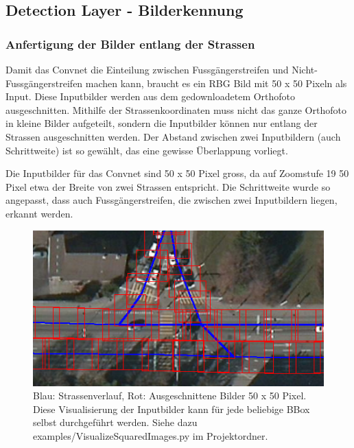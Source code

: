 
\subsection{Detection Layer - Bilderkennung}

\subsubsection{Anfertigung der Bilder entlang der Strassen}
Damit das Convnet die Einteilung zwischen Fussgängerstreifen und Nicht-Fussgängerstreifen machen kann, braucht es ein RBG Bild mit 50 x 50 Pixeln als Input. Diese \Gls{Inputbild}er werden aus dem gedownloadetem Orthofoto ausgeschnitten. Mithilfe der Strassenkoordinaten muss nicht das ganze Orthofoto in kleine Bilder aufgeteilt, sondern die Inputbilder können nur entlang der Strassen ausgeschnitten werden. Der Abstand zwischen zwei Inputbildern (auch Schrittweite) ist so gewählt, das eine gewisse Überlappung vorliegt.

Die Inputbilder für das Convnet sind 50 x 50 Pixel gross, da auf Zoomstufe 19 50 Pixel etwa der Breite von zwei Strassen entspricht. Die Schrittweite wurde so angepasst, dass auch Fussgängerstreifen, die zwischen zwei Inputbildern liegen, erkannt werden.

\begin{figure}[H]
	\centering
	\includegraphics{images/squared_images.png}
	\caption[Anfertigung Inputbilder]{Blau: Strassenverlauf, Rot: Ausgeschnittene Bilder 50 x 50 Pixel. Diese Visualisierung der Inputbilder kann für jede beliebige BBox selbst durchgeführt werden. Siehe dazu examples/VisualizeSquaredImages.py im Projektordner.}
\end{figure}



